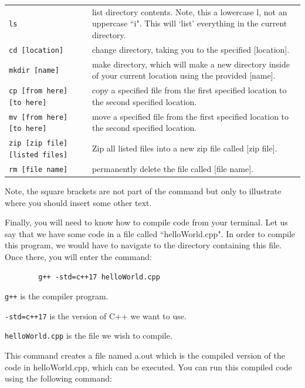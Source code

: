 \begin{table}[H]
    \begin{tabular}{p{2.5in}|p{4.0in}}
        \texttt{ls} &  list directory contents. Note, this a lowercase l, not an uppercase ``i". This will `list' everything in the current directory. \\
        \texttt{cd [location]} & change directory, taking you to the specified [location]. \\
        \texttt{mkdir [name]} & make directory, which will make a new directory inside of your current location using the provided [name]. \\
        \texttt{cp [from here] [to here]} & copy a specified file from the first specified location to the second specified location. \\
        \texttt{mv [from here] [to here]} & move a specified file from the first specified location to the second specified location. \\
        \texttt{zip [zip file] [listed files]} & Zip all listed files into a new zip file called [zip file]. \\
        \texttt{rm [file name]} & permanently delete the file called [file name].
    \end{tabular}
\end{table}

Note, the square brackets are not part of the command but only to illustrate where you should insert some other text.

Finally, you will need to know how to compile code from your terminal. Let us say that we have some code in a file called ``helloWorld.cpp". In order to compile this program, we would have to navigate to the directory containing this file. Once there, you will enter the command:

\begin{verbatim}
        g++ -std=c++17 helloWorld.cpp 
\end{verbatim}

\texttt{g++} is the compiler program.

\texttt{-std=c++17} is the version of C++ we want to use.

\texttt{helloWorld.cpp} is the file we wish to compile.

This command creates a file named a.out which is the compiled version of the code in helloWorld.cpp, which can be executed. You can run this compiled code using the following command:

